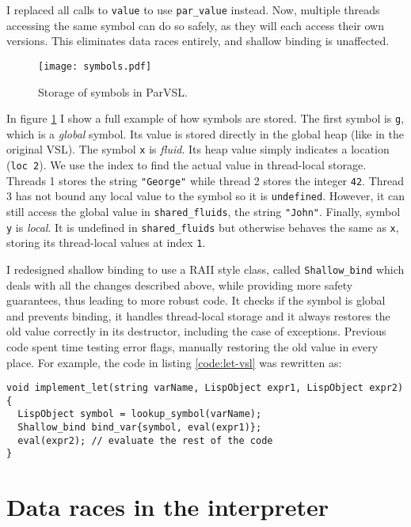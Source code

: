 I replaced all calls to \texttt{value} to use \texttt{par\_value} instead.
Now, multiple threads accessing the same symbol can do so safely,
as they will each access their own versions. This eliminates data races entirely,
and shallow binding is unaffected.

\begin{figure}[H]
  \centering
  \texttt{[image: symbols.pdf]}
  \caption{Storage of symbols in ParVSL.}
  \label{fig:symbols}
\end{figure}

In figure \ref{fig:symbols} I show a full example of how symbols are stored. The first symbol is \texttt{g}, which
is a \emph{global} symbol. Its value is stored directly in the global heap (like in the original VSL). The symbol \texttt{x}
is \emph{fluid}. Its heap value simply indicates a location (\texttt{loc 2}). We use the index to find the actual value
in thread-local storage. Threads 1 stores the string \texttt{"George"} while thread 2 stores the integer \texttt{42}.
Thread 3 has not bound any local value to the symbol so it is \texttt{undefined}. However, it can still access the
global value in \verb|shared_fluids|, the string \verb|"John"|. Finally, symbol \verb|y| is \emph{local}. It is
undefined in \verb|shared_fluids| but otherwise behaves the same as \verb|x|, storing its thread-local values at
index \verb|1|.

I redesigned shallow binding to use a RAII style class, called \verb|Shallow_bind| which deals with all the changes
described above, while providing more safety guarantees, thus leading to more robust code. It checks if the symbol is global and prevents binding,
it handles thread-local storage and it always restores the old value correctly in its destructor, including the
case of exceptions. Previous code spent time testing error flags, manually restoring the old value in every place.
For example, the code in listing \ref{code:let-vsl} was rewritten as:
\begin{code}
\begin{verbatim}
void implement_let(string varName, LispObject expr1, LispObject expr2) {
  LispObject symbol = lookup_symbol(varName);
  Shallow_bind bind_var{symbol, eval(expr1)};
  eval(expr2); // evaluate the rest of the code
}
\end{verbatim}
  \caption{Implementation of \texttt{let} in ParVSL.}
  \label{code:let-parvsl}
\end{code}

\section{Data races in the interpreter}
\label{sec:datarace}

